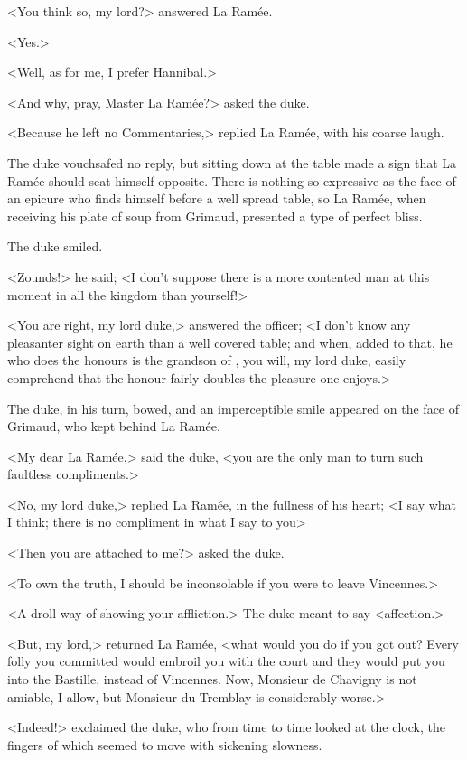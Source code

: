 <You think so, my lord?> answered La Ramée.

<Yes.>

<Well, as for me, I prefer Hannibal.>

<And why, pray, Master La Ramée?> asked the duke.

<Because he left no Commentaries,> replied La Ramée, with his coarse laugh.

The duke vouchsafed no reply, but sitting down at the table made a sign that La Ramée should seat himself opposite. There is nothing so expressive as the face of an epicure who finds himself before a well spread table, so La Ramée, when receiving his plate of soup from Grimaud, presented a type of perfect bliss.

The duke smiled.

<Zounds!> he said; <I don't suppose there is a more contented man at this moment in all the kingdom than yourself!>

<You are right, my lord duke,> answered the officer; <I don't know any pleasanter sight on earth than a well covered table; and when, added to that, he who does the honours is the grandson of , you will, my lord duke, easily comprehend that the honour fairly doubles the pleasure one enjoys.>

The duke, in his turn, bowed, and an imperceptible smile appeared on the face of Grimaud, who kept behind La Ramée.

<My dear La Ramée,> said the duke, <you are the only man to turn such faultless compliments.>

<No, my lord duke,> replied La Ramée, in the fullness of his heart; <I say what I think; there is no compliment in what I say to you\longdash>

<Then you are attached to me?> asked the duke.

<To own the truth, I should be inconsolable if you were to leave Vincennes.>

<A droll way of showing your affliction.> The duke meant to say <affection.>

<But, my lord,> returned La Ramée, <what would you do if you got out? Every folly you committed would embroil you with the court and they would put you into the Bastille, instead of Vincennes. Now, Monsieur de Chavigny is not amiable, I allow, but Monsieur du Tremblay is considerably worse.>

<Indeed!> exclaimed the duke, who from time to time looked at the clock, the fingers of which seemed to move with sickening slowness.


